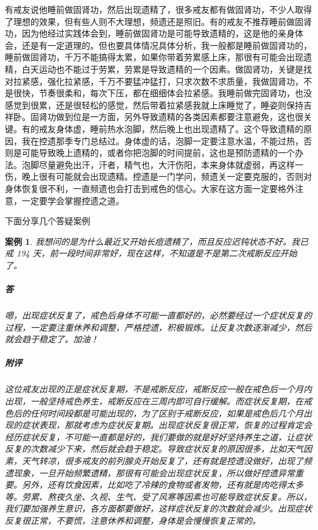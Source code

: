 \documentclass{ctexart}
\newtheorem{case}{案例}
\begin{document}
有戒友说他睡前做固肾功，然后出现遗精了，很多戒友都有做固肾功，不少人取得了理想的效果，但有些人则不大理想，频遗还是照旧。有的戒友不推荐睡前做固肾功，因为他经过实践体会到，睡前做固肾功是可能导致遗精的，这是他的亲身体会，还是有一定道理的。但也要具体情况具体分析，我一般都是睡前做固肾功的，睡前做固肾功，千万不能搞得太累，如果你带着劳累感上床，那很有可能会出现遗精，白天运动也不能过于劳累，劳累是导致遗精的一个因素。做固肾功，关键是找对拉紧感，强化拉紧感，千万不要猛冲猛打，只求次数不求质量，我做固肾功，不是很快，节奏很柔和，每次下压，都在细细体会拉紧感。我睡前做完固肾功，也没感觉到很累，还是很轻松的感觉，然后带着拉紧感我就上床睡觉了，睡姿则保持吉祥卧。固肾功做到位是一方面，另外导致遗精的各类因素都要注意避免，这也很关键。有的戒友身体虚，睡前热水泡脚，然后晚上也出现遗精了。这个导致遗精的原因，我在控遗那季专门总结过。身体虚的话，泡脚一定要注意水温，不能过热，否则是可能导致晚上遗精的，或者你把泡脚的时间提前，这也是预防遗精的一个办法。泡脚尽量避免出汗，汗者，精气也，大汗伤阳，本来身体就虚弱，再这样一伤，晚上很有可能就会出现遗精。控遗是一门学问，频遗关一定要克服的，否则对身体恢复很不利，一直频遗也会打击到戒色的信心。大家在这方面一定要格外注意，一定要学会掌握控遗之道。


下面分享几个答疑案例

\begin{case}
    我想问的是为什么最近又开始长痘遗精了，而且反应迟钝状态不好。我已戒 194 天，前一段时间非常好，现在这样，不知道是不是第二次戒断反应开始了。
    \subparagraph{答} 嗯，出现症状反复了，戒色后身体不可能一直都好的，必然要经过一个症状反复的过程，一定要注重休养和调整，严格控遗，积极锻炼。让反复次数逐渐减少，然后就会趋于稳定了。加油！
    \subparagraph{附评} 这位戒友出现的正是症状反复期，不是戒断反应，戒断反应一般在戒色后一个月内出现，一般坚持戒色养生，戒断反应在三周内即可自行缓解。而症状反复期，在戒色后的任何时间段都是可能出现的，为了区别于戒断反应，如果是戒色后几个月出现的症状表现，那就考虑为症状反复期。出现症状反复很正常，恢复的过程肯定会经历症状反复，不可能一直都是好的，我们要做的就是好好坚持养生之道，让症状反复的次数减少下来，然后就会趋于稳定。导致症状反复的原因很多，比如天气因素，天气转凉，很多戒友的前列腺炎开始反复了，还有就是控遗没做好，出现了频遗现象，一旦开始频繁遗精，那很有可能会出现症状反复，所以做好控遗异常重要。另外，还有饮食因素，比如吃了冷辣的食物或者发物，还有就是肉吃得太多等。劳累、熬夜久坐、久视、生气、受了风寒等因素也可能导致症状反复。所以，我们要加强养生意识，各方面都要做好，这样症状反复的次数就会减少。出现症状反复很正常，不要慌，注意休养和调整，身体是会慢慢恢复正常的。
\end{case}
\end{document}
